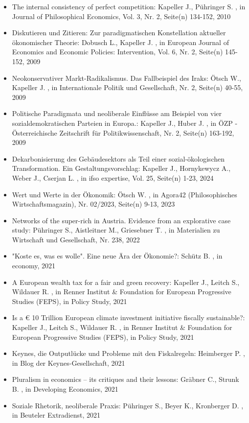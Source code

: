 \begin{itemize}
\item The internal consistency of perfect competition: Kapeller J., Pühringer S. , in Journal of Philosophical Economics, Vol. 3, Nr. 2, Seite(n) 134-152, 2010
\item Diskutieren und Zitieren: Zur paradigmatischen Konstellation aktueller ökonomischer Theorie: Dobusch L., Kapeller J. , in European Journal of Economics and Economic Policies: Intervention, Vol. 6, Nr. 2, Seite(n) 145-152, 2009
\item Neokonservativer Markt-Radikalismus. Das Fallbeispiel des Iraks: Ötsch W., Kapeller J. , in Internationale Politik und Gesellschaft, Nr. 2, Seite(n) 40-55, 2009
\item Politische Paradigmata und neoliberale Einflüsse am Beispiel von vier sozialdemokratischen Parteien in Europa.: Kapeller J., Huber J. , in ÖZP - Österreichische Zeitschrift für Politikwissenschaft, Nr. 2, Seite(n) 163-192, 2009
\item Dekarbonisierung des Gebäudesektors als Teil einer sozial-ökologischen Transformation. Ein Gestaltungsvorschlag: Kapeller J., Hornykewycz A., Weber J., Cserjan L. , in ifso expertise, Vol. 25, Seite(n) 1-23, 2024
\item Wert und Werte in der Ökonomik: Ötsch W. , in Agora42 (Philosophisches Wirtschaftsmagazin), Nr. 02/2023, Seite(n) 9-13, 2023
\item Networks of the super-rich in Austria. Evidence from an explorative case study: Pühringer S., Aistleitner M., Griesebner T. , in Materialien zu Wirtschaft und Gesellschaft, Nr. 238, 2022
\item "Koste es, was es wolle". Eine neue Ära der Ökonomie?: Schütz B. , in economy, 2021
\item A European wealth tax for a fair and green recovery: Kapeller J., Leitch S., Wildauer R. , in Renner Institut & Foundation for European Progressive Studies (FEPS), in Policy Study, 2021
\item Is a € 10 Trillion European climate investment initiative fiscally sustainable?: Kapeller J., Leitch S., Wildauer R. , in Renner Institut & Foundation for European Progressive Studies (FEPS), in Policy Study, 2021
\item Keynes, die Outputlücke und Probleme mit den Fiskalregeln: Heimberger P. , in Blog der Keynes-Gesellschaft, 2021
\item Pluralism in economics – its critiques and their lessons: Gräbner C., Strunk B. , in Developing Economics, 2021
\item Soziale Rhetorik, neoliberale Praxis: Pühringer S., Beyer K., Kronberger D. , in Beuteler Extradienst, 2021

\end{itemize}
